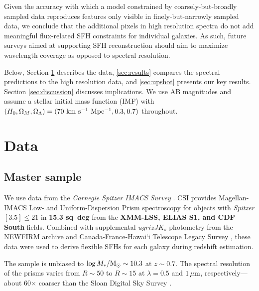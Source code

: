 \documentclass[a4paper,fleqn,usenatbib]{mnras}
\newcommand{\Msun}{{\rm M}_\odot}
\newcommand{\Mstel}{M_\ast}
\newcommand{\logM}{\log\Mstel/\Msun}
\newcommand{\resp}{respectively}
\newcommand{\bfr}{\bf\color{red}}
\begin{document}
Given the accuracy with which a model constrained by coarsely-but-broadly sampled data 
reproduces features only visible in finely-but-narrowly sampled data, we conclude that the additional 
pixels in high resolution spectra do not add meaningful flux-related SFH constraints for individual 
galaxies. As such, future surveys aimed at supporting SFH reconstruction should aim to maximize 
wavelength coverage as opposed to spectral resolution.

Below, Section \ref{sec:data} describes the data, \ref{sec:results} compares 
the spectral predictions to the high resolution data, and \ref{sec:upshot} presents our key results. 
Section \ref{sec:discussion} discusses implications. We use AB magnitudes and assume 
a \citet{Chabrier03} stellar initial mass function (IMF) with $(H_{0}, \Omega_{M}, \Omega_{\Lambda}) =
(70~{\rm km~s^{-1}~Mpc^{-1}}, 0.3, 0.7)$ throughout.



\section{Data}
\label{sec:data}

\subsection{Master sample}
\label{sec:master}

We use data from the {\it Carnegie Spitzer IMACS Survey} \citep[CSI;][]{Kelson14a}. CSI provides
Magellan-IMACS Low- and Uniform-Dispersion Prism spectroscopy \citep{Coil11} for objects with {\it Spitzer} 
$[3.5]\leq21$ in {\bfr 15.3 sq~deg} from the {\bfr XMM-LSS, ELIAS S1, and CDF South} fields. 
Combined with supplemental 
$ugrizJK_{s}$ photometry from the NEWFIRM archive \citep{Autry03} and 
Canada-France-Hawai`i Telescope Legacy Survey \citep[CFHTLS;][]{Cuillandre06}, these data were used to derive 
flexible SFHs for each galaxy during redshift estimation. 

The sample is unbiased to 
$\logM\sim10.3$ at $z\sim0.7$. The spectral resolution of the prisms varies from 
$R\sim50$ to $R\sim15$ at $\lambda=0.5$ and $1\,\hbox{$\mu$m}$, \resp---about 
60$\times$ coarser than the Sloan Digital Sky Survey \citep{York00}.
\end{document}
